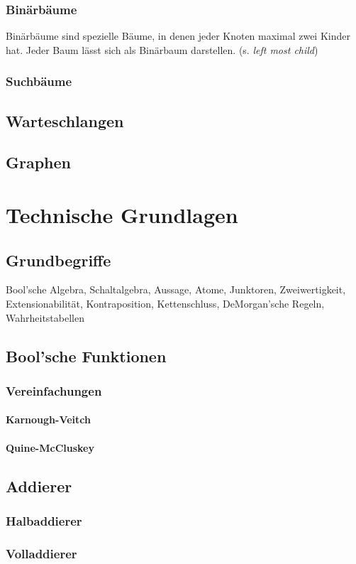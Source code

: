 \documentclass{article}
\begin{document}
\subsubsection{Binärbäume}
Binärbäume sind spezielle Bäume, in denen jeder Knoten maximal zwei Kinder hat. Jeder Baum lässt sich als Binärbaum darstellen. (s. \emph{left most child})
\subsubsection{Suchbäume}
\subsection{Warteschlangen}
\subsection{Graphen}
\section{Technische Grundlagen}
\subsection{Grundbegriffe}
Bool'sche Algebra, Schaltalgebra, Aussage, Atome, Junktoren, Zweiwertigkeit, Extensionabilität, Kontraposition, Kettenschluss, DeMorgan'sche Regeln, Wahrheitstabellen
\subsection{Bool'sche Funktionen}
\subsubsection{Vereinfachungen}
\paragraph{Karnough-Veitch}
\paragraph{Quine-McCluskey}
\subsection{Addierer}
\subsubsection{Halbaddierer}
\subsubsection{Volladdierer}
\end{document}
